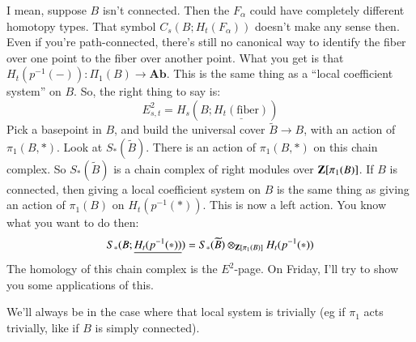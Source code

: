 I mean, suppose $B$ isn't connected.
Then the $F_\alpha$ could have completely different homotopy types.
That symbol $C_s(B;H_t(F_\alpha))$ doesn't make any sense then.
Even if you're path-connected, there's still no canonical way to identify the fiber over one point to the fiber over another point.
What you get is that $H_t(p^{-1}(-)):\Pi_1(B) \to \mathbf{Ab}$.
This is the same thing as a ``local coefficient system'' on $B$.
So, the right thing to say is:
$$
E^2_{s,t} = H_s(B;\underline{H_t(\mathrm{fiber})})
$$
Pick a basepoint in $B$, and build the universal cover $\widetilde{B}\to B$, with an action of $\pi_1(B,\ast)$.
Look at $S_\ast(\widetilde{B})$.
There is an action of $\pi_1(B,\ast)$ on this chain complex.
So $S_\ast(\widetilde{B})$ is a chain complex of right modules over $\mathbf Z[\pi_1(B)]$.
If $B$ is connected, then giving a local coefficient system on $B$ is the same thing as giving an action of $\pi_1(B)$ on $H_t(p^{-1}(\ast))$.
This is now a left action.
You know what you want to do then:
$$
S_\ast(B;\underline{H_t(p^{-1}(\ast))}) = S_\ast(\widetilde{B}) \otimes_{\mathbf Z[\pi_1(B)]} H_t(p^{-1}(\ast))
$$
The homology of this chain complex is the $E^2$-page.
On Friday, I'll try to show you some applications of this.

We'll always be in the case where that local system is trivially (eg if $\pi_1$ acts trivially, like if $B$ is simply connected).
